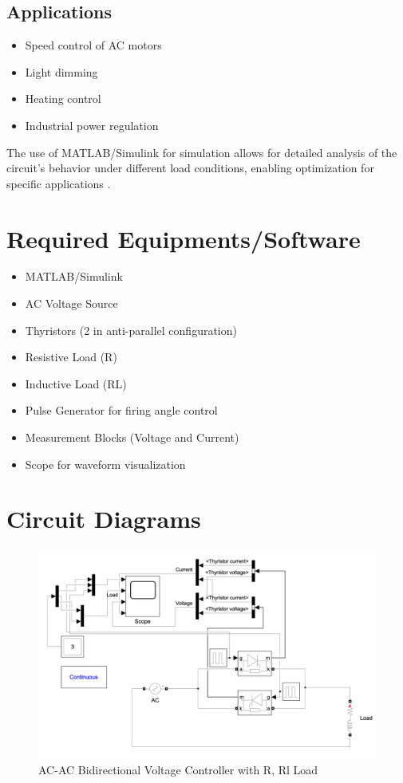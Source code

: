 \documentclass[12pt]{article}
\begin{document}
\subsection*{Applications}
\begin{itemize}
    \item Speed control of AC motors
    \item Light dimming
    \item Heating control
    \item Industrial power regulation
\end{itemize}

The use of MATLAB/Simulink for simulation allows for detailed analysis of the circuit's behavior under different load conditions, enabling optimization for specific applications \cite{mathworks2023simulink}.


\section*{Required Equipments/Software}
\begin{itemize}
    \item MATLAB/Simulink
    \item AC Voltage Source
    \item Thyristors (2 in anti-parallel configuration)
    \item Resistive Load (R)
    \item Inductive Load (RL)
    \item Pulse Generator for firing angle control
    \item Measurement Blocks (Voltage and Current)
    \item Scope for waveform visualization
\end{itemize}

\section*{Circuit Diagrams}
\begin{figure}[H]
    \centering
    \includegraphics[width=\textwidth]{ckt.png}
    \caption{AC-AC Bidirectional Voltage Controller with R, Rl Load}
\end{figure}
\end{document}
